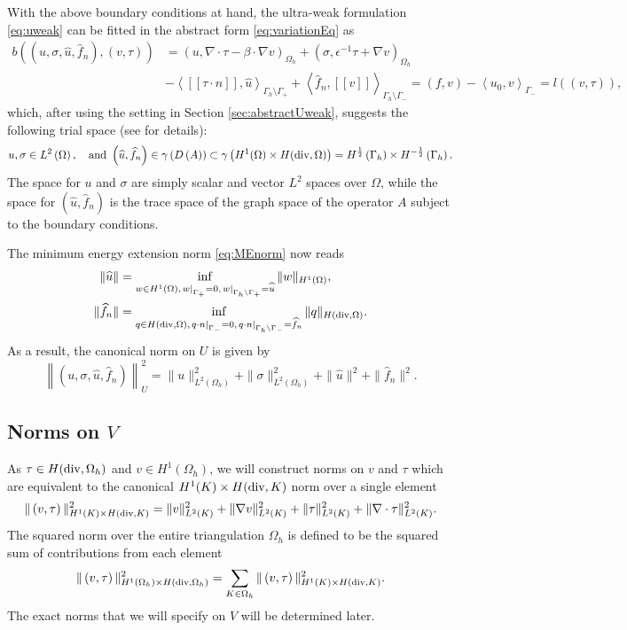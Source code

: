 \documentclass[11pt,onecolumn]{scrartcl}
\newcommand{\eqnref}[1]{\eqref{eq:#1}}
\newcommand{\secref}[1]{\ref{sec:#1}}
\newcommand{\LRp}[1]{\left( #1 \right)}
\newcommand{\LRs}[1]{\left[ #1 \right]}
\newcommand{\LRa}[1]{\left\langle #1 \right\rangle}
\newcommand{\jump}[1] {\ensuremath{\LRs{\![#1]\!}}}
\newcommand{\uh}{\widehat{u}}
\newcommand{\fnh}{\widehat{f}_n}
\renewcommand{\L}{L^2\LRp{\Omega}}
\newcommand{\Gh}{\Gamma_h}
\newcommand{\Gm}{\Gamma_{-}}
\newcommand{\Gp}{\Gamma_{+}}
\newcommand{\Oh}{\Omega_h}
\newcommand{\grad}{\nabla}
\renewcommand{\div}{\grad \cdot}
\begin{document}
With the above boundary conditions at hand, the ultra-weak formulation
\eqnref{uweak} can be fitted in the abstract form \eqnref{variationEq}
as
\begin{align*}
b\left(\left(u,\sigma, \widehat{u}, \widehat{f}_n\right), \left( v,
\tau\right)\right) &= \left(u,\div \tau - \beta \cdot \grad
v\right)_{\Oh} + \left(\sigma, \epsilon^{-1} \tau + \grad
v\right)_{\Oh} \\
&- \LRa{ \jump{\tau\cdot n}, \widehat{u} }_{\Gh
  \setminus \Gp} + \LRa{ \widehat{f}_n, \jump{v} }_{\Gamma_h \setminus
  \Gm} =  \left(f, v\right) -
\LRa{ u_0, v }_{\Gamma_-} = l\left(\left(v, \tau\right)\right),
\end{align*}
which, after using the setting in Section \secref{abstractUweak},
suggests the following trial space (see \cite{analysisDPG, Bui-ThanhDemkowiczGhattas11b} for details):
\begin{align*}
u, \sigma \in \L, \quad \text{and } \LRp{\uh,\fnh} \in
\gamma\LRp{D\LRp{A}} \subset \gamma\LRp{  H^1(\Omega) \times
H({\rm div}, \Omega)} = H^{\frac{1}{2}}\left(\Gh\right) \times H^{-\frac{1}{2}}\left(\Gh\right).
\end{align*}
The space for $u$ and $\sigma$ are simply scalar and vector $L^2$ spaces over $\Omega$, while the space for $\left(\uh,\fnh\right)$ is the trace space of the graph space of the operator $A$ subject to the boundary conditions.

The minimum energy extension norm \eqnref{MEnorm} now reads
\begin{align*}
\|\widehat{u}\| &= \inf_{w\in H^1(\Omega),
  \left.w\right|_{\Gamma_+}=0, \left.w\right |_{\Gh\setminus
    \Gamma_+ } = \widehat{u}} \|w\|_{H^1(\Omega)}, \\ \|\widehat{f}_n\|
&= \inf_{q\in H({\rm div},\Omega), \left.q\cdot n\right|_{\Gamma_-}=
  0, \left. q\cdot n \right |_{\Gh\setminus
    \Gamma_-} = \widehat{f}_n}
\|q\|_{H({\rm div},\Omega)}.
\end{align*}
As a result, the canonical norm on $U$ is given by
\[
\left\|\left(u,\sigma,\widehat{u},\widehat{f}_n\right)\right\|_U^2 = 
\|u\|_{L^2(\Oh)}^2 + \|\sigma\|_{L^2(\Oh)}^2 +
\|\widehat{u}\|^2 + \|\widehat{f}_n\|^2.
\]

\subsection{Norms on $V$}

As $\tau \in H({\rm div},\Oh)$ and $v \in H^1(\Oh)$, we will
construct norms on $v$ and $\tau$ 
which are equivalent to the canonical $H^1(K) \times H({\rm div},K)$
norm over a single element
\[
\|\left(v,\tau\right)\|_{H^1(K) \times H({\rm div},K)}^2 =
\|v\|_{L^2(K)}^2 + \|\grad v\|_{L^2(K)}^2 + \|\tau\|_{L^2(K)}^2 +
\|\div \tau\|_{L^2(K)}^2.
\]
The squared norm over the entire triangulation $\Oh$ is defined to be the squared sum of contributions from each element
\[
\|\left(v,\tau\right)\|_{H^1(\Oh) \times H({\rm div},\Oh)}^2
= \sum_{K\in \Oh} \|\left(v,\tau\right)\|_{H^1(K) \times H({\rm
    div},K)}^2.
\]
The exact norms that we will specify on $V$ will be determined later. 
\end{document}
